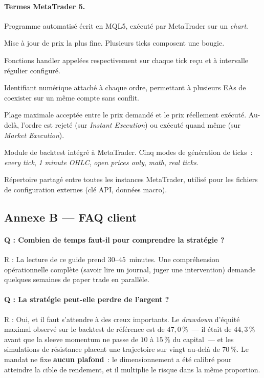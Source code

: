 \documentclass[11pt, a4paper]{scrartcl}
\begin{document}
\paragraph{Termes MetaTrader 5.}

\begin{description}[leftmargin=4.5cm, style=nextline]
\item[\textbf{Expert Advisor (EA)}] Programme automatisé écrit en MQL5, exécuté par MetaTrader sur un \emph{chart}.
\item[\textbf{Tick}] Mise à jour de prix la plus fine. Plusieurs ticks composent une bougie.
\item[\textbf{OnTick / OnTimer}] Fonctions handler appelées respectivement sur chaque tick reçu et à intervalle régulier configuré.
\item[\textbf{Magic number}] Identifiant numérique attaché à chaque ordre, permettant à plusieurs EAs de coexister sur un même compte sans conflit.
\item[\textbf{Slippage tolerance / Deviation}] Plage maximale acceptée entre le prix demandé et le prix réellement exécuté. Au-delà, l'ordre est rejeté (sur \emph{Instant Execution}) ou exécuté quand même (sur \emph{Market Execution}).
\item[\textbf{Strategy Tester}] Module de backtest intégré à MetaTrader. Cinq modes de génération de ticks~: \emph{every tick}, \emph{1 minute OHLC}, \emph{open prices only}, \emph{math}, \emph{real ticks}.
\item[\textbf{Common\textbackslash Files}] Répertoire partagé entre toutes les instances MetaTrader, utilisé pour les fichiers de configuration externes (clé API, données macro).
\end{description}

\subsection*{Annexe B --- FAQ client}

\paragraph{Q : Combien de temps faut-il pour comprendre la stratégie ?}
R : La lecture de ce guide prend $30$--$45$~minutes. Une compréhension opérationnelle complète (savoir lire un journal, juger une intervention) demande quelques semaines de paper trade en parallèle.

\paragraph{Q : La stratégie peut-elle perdre de l'argent ?}
R : Oui, et il faut s'attendre à des creux importants. Le \emph{drawdown} d'équité maximal observé sur le backtest de référence est de $47{,}0\,\%$~--- il était de $44{,}3\,\%$ avant que la sleeve momentum ne passe de $10$ à $15\,\%$ du capital~--- et les simulations de résistance placent une trajectoire sur vingt au-delà de $70\,\%$. Le mandat ne fixe \textbf{aucun plafond}~: le dimensionnement a été calibré pour atteindre la cible de rendement, et il multiplie le risque dans la même proportion.
\end{document}
